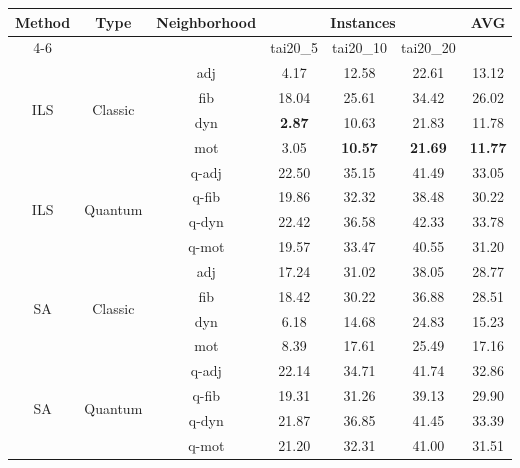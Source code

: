 \setlength{\tabcolsep}{3pt}

\begin{tabular}{@{}ccc cccc@{}}
\textbf{Method} & \textbf{Type} & \textbf{Neighborhood} & 
\multicolumn{3}{c}{\textbf{Instances}} & \textbf{AVG} \\
\cline{4-6}
& & & tai20\_5 & tai20\_10 & tai20\_20 & \\
\hline

\multirow{4}{*}{ILS}
& \multirow{4}{*}{Classic}
& adj & 4.17 & 12.58 & 22.61 & 13.12 \\
& & fib & 18.04 & 25.61 & 34.42 & 26.02 \\
& & dyn & {\bfseries 2.87} & 10.63 & 21.83 & 11.78 \\
& & mot & 3.05 & {\bfseries 10.57} & {\bfseries 21.69} & {\bfseries 11.77} \\

\multirow{4}{*}{ILS}
& \multirow{4}{*}{Quantum}
& q-adj & 22.50 & 35.15 & 41.49 & 33.05 \\
& & q-fib & 19.86 & 32.32 & 38.48 & 30.22 \\
& & q-dyn & 22.42 & 36.58 & 42.33 & 33.78 \\
& & q-mot & 19.57 & 33.47 & 40.55 & 31.20 \\

\hline

\multirow{4}{*}{SA}
& \multirow{4}{*}{Classic}
& adj & 17.24 & 31.02 & 38.05 & 28.77 \\
& & fib & 18.42 & 30.22 & 36.88 & 28.51 \\
& & dyn & 6.18 & 14.68 & 24.83 & 15.23 \\
& & mot & 8.39 & 17.61 & 25.49 & 17.16 \\

\multirow{4}{*}{SA}
& \multirow{4}{*}{Quantum}
& q-adj & 22.14 & 34.71 & 41.74 & 32.86 \\
& & q-fib & 19.31 & 31.26 & 39.13 & 29.90 \\
& & q-dyn & 21.87 & 36.85 & 41.45 & 33.39 \\
& & q-mot & 21.20 & 32.31 & 41.00 & 31.51 \\

\hline
\end{tabular}